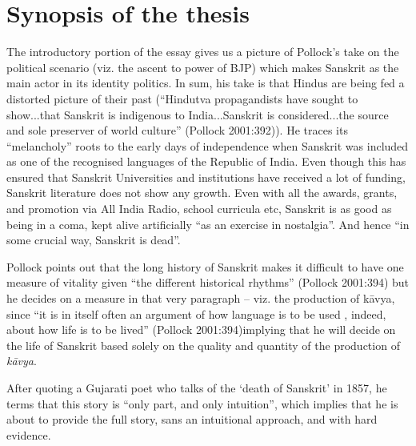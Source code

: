 \section{Synopsis of the thesis}

The introductory portion of the essay gives us a picture of Pollock’s take on the political scenario (viz. the ascent to power of BJP) which makes Sanskrit as the main actor in its identity politics. In sum, his take is that Hindus are being fed a distorted picture of their past (“Hindutva propagandists have sought to show...that Sanskrit is indigenous to India...Sanskrit is considered...the source and sole preserver of world culture” (Pollock 2001:392)). He traces its “melancholy” roots to the early days of independence when Sanskrit was included as one of the recognised languages of the Republic of India. Even though this has ensured that Sanskrit Universities and institutions have received a lot of funding, Sanskrit literature does not show any growth.  Even with all the awards, grants, and promotion via All India Radio, school curricula etc, Sanskrit is as good as being in a coma, kept alive artificially “as an exercise in nostalgia”. And hence “in some crucial way, Sanskrit is dead”.

Pollock points out that the long history of Sanskrit makes it difficult to have one measure of vitality given “the different historical rhythms” (Pollock 2001:394) but he decides on a measure in that very paragraph – viz. the production of kāvya, since “it is in itself often an argument of how language is to be used , indeed, about how life is to be lived” (Pollock 2001:394)implying that he will decide on the life of Sanskrit based solely on the quality and quantity of the production of {\sl kāvya}.

After quoting a Gujarati poet who talks of the ‘death of Sanskrit’ in 1857, he terms that this story is “only part, and only intuition”, which implies that he is about to provide the full story, sans an intuitional approach, and with hard evidence.

